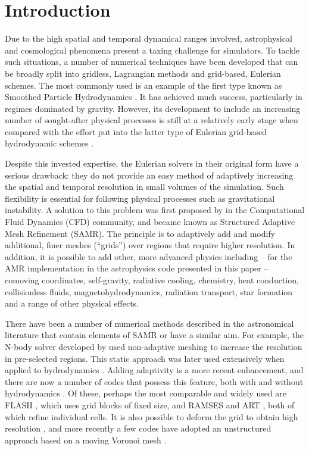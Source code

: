 \section{Introduction}\label{sec.intro}

Due to the high spatial and temporal dynamical ranges involved,
astrophysical and cosmological phenomena present a taxing challenge
for simulators. To tackle such situations, a number of numerical
techniques have been developed that can be broadly split into
gridless, Lagrangian methods and grid-based, Eulerian schemes. The
most commonly used is an example of the first type known as Smoothed
Particle Hydrodynamics \citep[SPH;][]{Lucy77, SPH}. It has achieved
much success, particularly in regimes dominated by gravity. However,
its development to include an increasing number of sought-after
physical processes is still at a relatively early stage when compared
with the effort put into the latter type of Eulerian grid-based
hydrodynamic schemes \citep[e.g.,][]{laney-1998, toro-1997,
Woodward84}.

Despite this invested expertise, the Eulerian solvers in their
original form have a serious drawback: they do not provide an easy
method of adaptively increasing the spatial and temporal resolution in
small volumes of the simulation. Such flexibility is essential for
following physical processes such as gravitational instability. A
solution to this problem was first proposed by \citet{Berger89} in the
Computational Fluid Dynamics (CFD) community, and became known as
Structured Adaptive Mesh Refinement (SAMR). The principle is to
adaptively add and modify additional, finer meshes (``grids'') over
regions that require higher resolution. In addition, it is possible to
add other, more advanced physics including -- for the AMR
implementation in the astrophysics code presented in this paper --
comoving coordinates, self-gravity, radiative cooling, chemistry, heat
conduction, collisionless fluids, magnetohydrodynamics, radiation
transport, star formation and a range of other physical effects.
\newpage

There have been a number of numerical methods described in the
astronomical literature that contain elements of SAMR or have a
similar aim. For example, the N-body solver developed by
\citet{Villumsen89} used non-adaptive meshing to increase the
resolution in pre-selected regions. This static approach was later
used extensively when applied to hydrodynamics
\citep[e.g.,][]{Ruffert94, Anninos94}. Adding adaptivity is a more
recent enhancement, and there are now a number of codes that possess
this feature, both with and without hydrodynamics \citep{Couchman91,
Jessop94, Suisalu95, Splinter96, Gelato97, ART97, Truelove98,
flash_method, MLAPM01, Yahagi01, RAMSES, Quilis04, Ziegler05, Zhang06,
CHARM, Astrobear09, Pluto-amr, GAMER, Nyx}. Of these, perhaps the most
comparable and widely used are FLASH \citep{flash_method}, which uses
grid blocks of fixed size, and RAMSES \citep{RAMSES} and ART
\citep{ART97}, both of which refine individual cells. It is also
possible to deform the grid to obtain high resolution
\citep[e.g.,][]{Gnedin95, Xu97, Pen98}, and more recently a few codes
have adopted an unstructured approach based on a moving Voronoi mesh
\citep{Arepo10, Tess11}.

